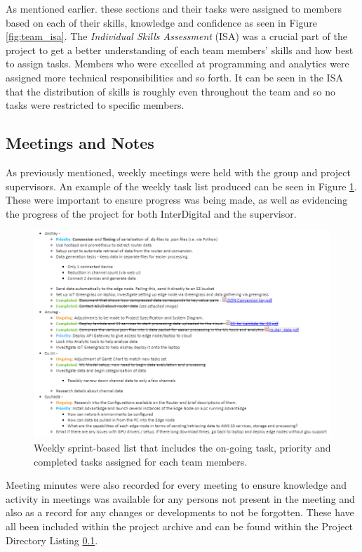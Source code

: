 As mentioned earlier. these sections and their tasks were assigned to members based on each of their skills, knowledge and confidence as seen in Figure \ref{fig:team_isa}. The \textit{Individual Skills Assessment} (ISA) was a crucial part of the project to get a better understanding of each team members' skills and how best to assign tasks. Members who were excelled at programming and analytics were assigned more technical responsibilities and so forth. It can be seen in the ISA that the distribution of skills is roughly even throughout the team and so no tasks were restricted to specific members.

\subsection{Meetings and Notes}
As previously mentioned, weekly meetings were held with the group and project supervisors. An example of the weekly task list produced can be seen in Figure \ref{fig:task_list}. These were important to ensure progress was being made, as well as evidencing the progress of the project for both InterDigital and the supervisor.

\begin{figure}[ht]
    \centering
    \includegraphics[width=1\linewidth]{images/Task_list.png}
    \caption{Weekly sprint-based list that includes the on-going task, priority and completed tasks assigned for each team members.}
    \label{fig:task_list}
\end{figure}

Meeting minutes were also recorded for every meeting to ensure knowledge and activity in meetings was available for any persons not present in the meeting and also as a record for any changes or developments to not be forgotten. These have all been included within the project archive and can be found within the Project Directory Listing \ref{}.

